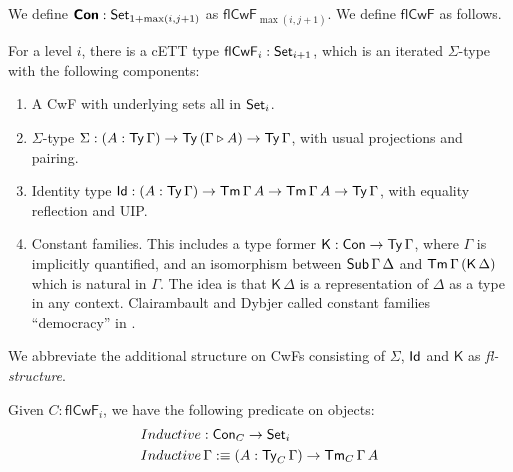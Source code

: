 \documentclass[sigplan,review,anonymous]{acmart}\settopmatter{printfolios=true,printccs=false,printacmref=false}
\newcommand{\ext}{\triangleright}
\newcommand{\Sg}{\Sigma}
\newcommand{\flCwF}{\mathsf{flCwF}}
\newcommand{\Kfam}{\mathsf{K}}
\begin{document}
We define $\boldsymbol{\mathsf{Con}} : \mathsf{Set}_{1+\max(i,j+1)}$ as $\flCwF_{\max(i,j+1)}$. We define
$\flCwF$ as follows.

\begin{definition}\label{def:flCwF}
For a level $i$, there is a cETT type $\flCwF_i : \Set_{i+1}$, which is an
iterated $\Sigma$-type with the following components:
\begin{enumerate}
  \item A CwF with underlying sets all in $\mathsf{Set}_i$.
  \item $\Sigma$-type $\Sg : (A : \Ty\,\Gamma)\ra \Ty\,(\Gamma \ext A)
    \ra \Ty\,\Gamma$, with usual projections and pairing.
  \item Identity type $\mathsf{Id} : (A : \mathsf{Ty}\,\Gamma)\rightarrow \mathsf{Tm}\,\Gamma\,A\rightarrow
    \mathsf{Tm}\,\Gamma\,A\rightarrow \mathsf{Ty}\,\Gamma$, with equality reflection and UIP.
  \item Constant families. This includes a type former $\Kfam : \Con \ra
    \Ty\,\Gamma$, where $\Gamma$ is implicitly quantified, and an isomorphism
    between $\mathsf{Sub}\,\Gamma\,\Delta$ and $\Tm\,\Gamma\,(\Kfam\,\Delta)$ which is
    natural in $\Gamma$. The idea is that $\Kfam\,\Delta$ is a representation
    of $\Delta$ as a type in any context. Clairambault and Dybjer called constant
    families ``democracy'' in \cite{clairambault2014biequivalence}.
\end{enumerate}
\end{definition}

\begin{definition} We abbreviate the additional structure on CwFs consisting of $\Sigma$, $\mathsf{Id}$ and
$\Kfam$ as \emph{fl-structure}.
\end{definition}


\begin{definition}
Given $C : \flCwF_i$, we have the following predicate on objects:
\begin{alignat*}{3}
  & Inductive : \mathsf{Con}_C \rightarrow \mathsf{Set}_i \\
  & Inductive\,\Gamma :\equiv (A : \mathsf{Ty}_C\,\Gamma)\rightarrow \mathsf{Tm}_C\,\Gamma\,A
\end{alignat*}
\end{definition}
\end{document}

